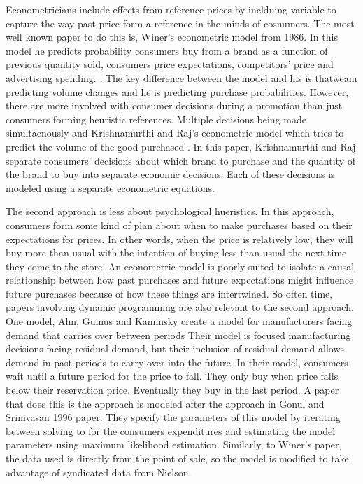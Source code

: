 \documentclass{article}
\begin{document}
Econometricians include effects from reference prices by inclduing variable to capture the way past price form a reference in the minds of cosnumers. The most well known paper to do this is, Winer's econometric model from 1986. In this model he predicts probability consumers buy from a brand as a function of previous quantity sold, consumers price expectations, competitors' price and advertising spending.  \cite{winer}. The key difference between the model and his is thatweam predicting volume changes and he is predicting purchase probabilities. However, there are more involved with consumer decisions during a promotion than just consumers forming heuristic references. Multiple decisions being made simultaenously and Krishnamurthi and Raj's econometric model which tries to predict the volume of the good purchased \cite{krishnamurthi}.  In this paper, Krishnamurthi and Raj separate consumers' decisions about which brand to purchase and the quantity of the brand to buy into separate economic decisions. Each of these decisions is modeled using a separate econometric equations.

The second approach is less about psychological hueristics. In this approach, consumers form some kind of plan about when to make purchases based on their expectations for prices. In other words, when the price is relatively low, they will buy more than usual with the intention of buying less than usual the next time they come to the store. An econometric model is poorly suited to isolate a causal relationship between how past purchases and future expectations might influence future purchases because of how these things are intertwined. So often time, papers involving dynamic programming are also relevant to the second approach.  One model, Ahn, Gumus and Kaminsky create a model for manufacturers facing demand that carries over between periods \cite{ahn} Their model is focused manufacturing decisions facing residual demand, but their inclusion of residual demand allows demand in past periods to carry over into the future. In their model, consumers wait until a future period for the price to fall. They only buy when price falls below their reservation price. Eventually they buy in the last period.  A paper that does this is  the approach is modeled after the approach in Gonul and Srinivasan 1996 paper\cite{gonul}. They specify the parameters of this model by iterating between solving to for the consumers expenditures and estimating the model parameters using maximum likelihood estimation. Similarly, to Winer's paper,  the data used is directly from the point of sale, so the model is modified to take advantage of syndicated data from Nielson.
\end{document}
